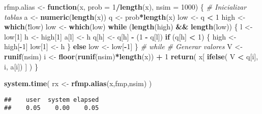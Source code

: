 \documentclass[
]{book}
\newenvironment{Shaded}{\begin{snugshade}}{\end{snugshade}}
\newcommand{\CommentTok}[1]{\textcolor[rgb]{0.56,0.35,0.01}{\textit{#1}}}
\newcommand{\ControlFlowTok}[1]{\textcolor[rgb]{0.13,0.29,0.53}{\textbf{#1}}}
\newcommand{\DataTypeTok}[1]{\textcolor[rgb]{0.13,0.29,0.53}{#1}}
\newcommand{\DecValTok}[1]{\textcolor[rgb]{0.00,0.00,0.81}{#1}}
\newcommand{\KeywordTok}[1]{\textcolor[rgb]{0.13,0.29,0.53}{\textbf{#1}}}
\newcommand{\NormalTok}[1]{#1}
\newcommand{\OperatorTok}[1]{\textcolor[rgb]{0.81,0.36,0.00}{\textbf{#1}}}
\newcommand{\StringTok}[1]{\textcolor[rgb]{0.31,0.60,0.02}{#1}}
\theoremstyle{break}
\theoremstyle{definition}
\theoremstyle{definition}
\theoremstyle{definition}
\theoremstyle{remark}
\begin{document}
\begin{Shaded}
\begin{Highlighting}[]
\NormalTok{rfmp.alias <-}\StringTok{ }\ControlFlowTok{function}\NormalTok{(x, }\DataTypeTok{prob =} \DecValTok{1}\OperatorTok{/}\KeywordTok{length}\NormalTok{(x), }\DataTypeTok{nsim =} \DecValTok{1000}\NormalTok{) \{}
  \CommentTok{# Inicializar tablas}
\NormalTok{  a <-}\StringTok{ }\KeywordTok{numeric}\NormalTok{(}\KeywordTok{length}\NormalTok{(x))}
\NormalTok{  q <-}\StringTok{ }\NormalTok{prob}\OperatorTok{*}\KeywordTok{length}\NormalTok{(x)}
\NormalTok{  low <-}\StringTok{ }\NormalTok{q }\OperatorTok{<}\StringTok{ }\DecValTok{1}
\NormalTok{  high <-}\StringTok{ }\KeywordTok{which}\NormalTok{(}\OperatorTok{!}\NormalTok{low)}
\NormalTok{  low <-}\StringTok{ }\KeywordTok{which}\NormalTok{(low)}
  \ControlFlowTok{while}\NormalTok{ (}\KeywordTok{length}\NormalTok{(high) }\OperatorTok{&&}\StringTok{ }\KeywordTok{length}\NormalTok{(low)) \{}
\NormalTok{    l <-}\StringTok{ }\NormalTok{low[}\DecValTok{1}\NormalTok{]}
\NormalTok{    h <-}\StringTok{ }\NormalTok{high[}\DecValTok{1}\NormalTok{]}
\NormalTok{    a[l] <-}\StringTok{ }\NormalTok{h}
\NormalTok{    q[h] <-}\StringTok{ }\NormalTok{q[h] }\OperatorTok{-}\StringTok{ }\NormalTok{(}\DecValTok{1} \OperatorTok{-}\StringTok{ }\NormalTok{q[l])}
    \ControlFlowTok{if}\NormalTok{ (q[h] }\OperatorTok{<}\StringTok{ }\DecValTok{1}\NormalTok{) \{}
\NormalTok{      high <-}\StringTok{ }\NormalTok{high[}\OperatorTok{-}\DecValTok{1}\NormalTok{]}
\NormalTok{      low[}\DecValTok{1}\NormalTok{] <-}\StringTok{ }\NormalTok{h}
\NormalTok{    \} }\ControlFlowTok{else}\NormalTok{ low <-}\StringTok{ }\NormalTok{low[}\OperatorTok{-}\DecValTok{1}\NormalTok{]}
\NormalTok{  \} }\CommentTok{# while}
  \CommentTok{# Generar valores}
\NormalTok{  V <-}\StringTok{ }\KeywordTok{runif}\NormalTok{(nsim)}
\NormalTok{  i <-}\StringTok{ }\KeywordTok{floor}\NormalTok{(}\KeywordTok{runif}\NormalTok{(nsim)}\OperatorTok{*}\KeywordTok{length}\NormalTok{(x)) }\OperatorTok{+}\StringTok{ }\DecValTok{1}
  \KeywordTok{return}\NormalTok{( x[ }\KeywordTok{ifelse}\NormalTok{( V }\OperatorTok{<}\StringTok{ }\NormalTok{q[i], i, a[i]) ] )}
\NormalTok{\}}


\KeywordTok{system.time}\NormalTok{( rx <-}\StringTok{ }\KeywordTok{rfmp.alias}\NormalTok{(x,fmp,nsim) )}
\end{Highlighting}
\end{Shaded}

\begin{verbatim}
##    user  system elapsed 
##    0.05    0.00    0.05
\end{verbatim}
\end{document}
